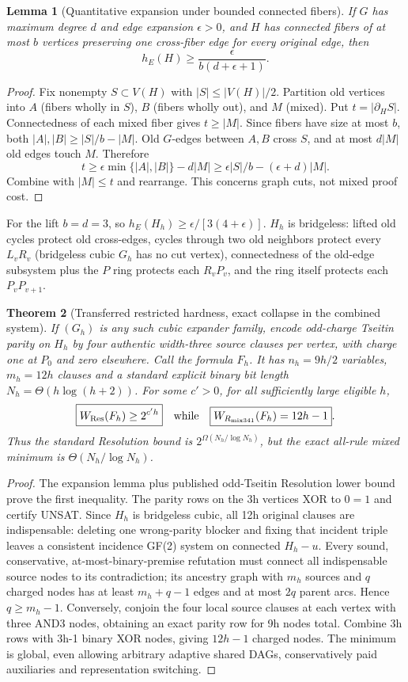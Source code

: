 \documentclass[11pt]{article}
\newtheorem{theorem}{Theorem}
\newtheorem{lemma}[theorem]{Lemma}
\begin{document}
\begin{lemma}[Quantitative expansion under bounded connected fibers]
If $G$ has maximum degree $d$ and edge expansion $\epsilon>0$, and $H$ has connected fibers of at most $b$ vertices preserving one cross-fiber edge for every original edge, then
\[
 \boxed{h_E(H)\ge\frac{\epsilon}{b(d+\epsilon+1)}}.
\]
\end{lemma}
\begin{proof}
Fix nonempty $S\subset V(H)$ with $|S|\le|V(H)|/2$. Partition old vertices into $A$ (fibers wholly in $S$), $B$ (fibers wholly out), and $M$ (mixed). Put $t=|\partial_HS|$. Connectedness of each mixed fiber gives $t\ge|M|$. Since fibers have size at most $b$, both $|A|,|B|\ge|S|/b-|M|$. Old $G$-edges between $A,B$ cross $S$, and at most $d|M|$ old edges touch $M$. Therefore
\[
 t\ge\epsilon\min\{|A|,|B|\}-d|M|
 \ge\epsilon|S|/b-(\epsilon+d)|M|.
\]
Combine with $|M|\le t$ and rearrange. This concerns graph cuts, not mixed proof cost.
\end{proof}
For the lift $b=d=3$, so $h_E(H_h)\ge\epsilon/[3(4+\epsilon)]$. $H_h$ is bridgeless: lifted old cycles protect old cross-edges, cycles through two old neighbors protect every $L_vR_v$ (bridgeless cubic $G_h$ has no cut vertex), connectedness of the old-edge subsystem plus the $P$ ring protects each $R_vP_v$, and the ring itself protects each $P_vP_{v+1}$.

\begin{theorem}[Transferred restricted hardness, exact collapse in the combined system]
If $(G_h)$ is any such cubic expander family, encode odd-charge Tseitin parity on $H_h$ by four authentic width-three source clauses per vertex, with charge one at $P_0$ and zero elsewhere. Call the formula $F_h$. It has $n_h=9h/2$ variables, $m_h=12h$ clauses and a standard explicit binary bit length $N_h=\Theta(h\log(h+2))$. For some $c'>0$, for all sufficiently large eligible $h$,
\[
 \boxed{W_{\rm Res}(F_h)\ge2^{c'h}}
 \quad\text{while}\quad
 \boxed{W_{R_{\rm mix341}}(F_h)=12h-1}.
\]
Thus the standard Resolution bound is $2^{\Omega(N_h/\log N_h)}$, but the exact all-rule mixed minimum is $\Theta(N_h/\log N_h)$.
\end{theorem}
\begin{proof}
The expansion lemma plus published odd-Tseitin Resolution lower bound prove the first inequality. The parity rows on the 3h vertices XOR to $0=1$ and certify UNSAT. Since $H_h$ is bridgeless cubic, all 12h original clauses are indispensable: deleting one wrong-parity blocker and fixing that incident triple leaves a consistent incidence GF(2) system on connected $H_h-u$. Every sound, conservative, at-most-binary-premise refutation must connect all indispensable source nodes to its contradiction; its ancestry graph with $m_h$ sources and $q$ charged nodes has at least $m_h+q-1$ edges and at most $2q$ parent arcs. Hence $q\ge m_h-1$. Conversely, conjoin the four local source clauses at each vertex with three AND3 nodes, obtaining an exact parity row for 9h nodes total. Combine 3h rows with 3h-1 binary XOR nodes, giving $12h-1$ charged nodes. The minimum is global, even allowing arbitrary adaptive shared DAGs, conservatively paid auxiliaries and representation switching.
\end{proof}
\end{document}
